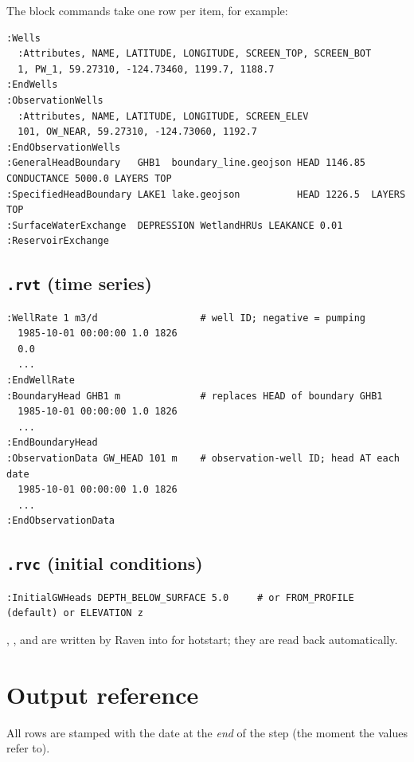 The block commands take one row per item, for example:
\begin{lstlisting}
:Wells
  :Attributes, NAME, LATITUDE, LONGITUDE, SCREEN_TOP, SCREEN_BOT
  1, PW_1, 59.27310, -124.73460, 1199.7, 1188.7
:EndWells
:ObservationWells
  :Attributes, NAME, LATITUDE, LONGITUDE, SCREEN_ELEV
  101, OW_NEAR, 59.27310, -124.73060, 1192.7
:EndObservationWells
:GeneralHeadBoundary   GHB1  boundary_line.geojson HEAD 1146.85 CONDUCTANCE 5000.0 LAYERS TOP
:SpecifiedHeadBoundary LAKE1 lake.geojson          HEAD 1226.5  LAYERS TOP
:SurfaceWaterExchange  DEPRESSION WetlandHRUs LEAKANCE 0.01
:ReservoirExchange
\end{lstlisting}

\subsection{\texttt{.rvt} (time series)}
\begin{lstlisting}
:WellRate 1 m3/d                  # well ID; negative = pumping
  1985-10-01 00:00:00 1.0 1826
  0.0
  ...
:EndWellRate
:BoundaryHead GHB1 m              # replaces HEAD of boundary GHB1
  1985-10-01 00:00:00 1.0 1826
  ...
:EndBoundaryHead
:ObservationData GW_HEAD 101 m    # observation-well ID; head AT each date
  1985-10-01 00:00:00 1.0 1826
  ...
:EndObservationData
\end{lstlisting}

\subsection{\texttt{.rvc} (initial conditions)}
\par\noindent\begin{minipage}{\linewidth}
\begin{lstlisting}
:InitialGWHeads DEPTH_BELOW_SURFACE 5.0     # or FROM_PROFILE (default) or ELEVATION z
\end{lstlisting}
\end{minipage}\par\smallskip
{}, ,  and  are written by Raven into
 for hotstart; they are read back automatically.

\section{Output reference}\label{ch:outputs}
All rows are stamped with the date at the \emph{end} of the step (the moment the values refer to).
